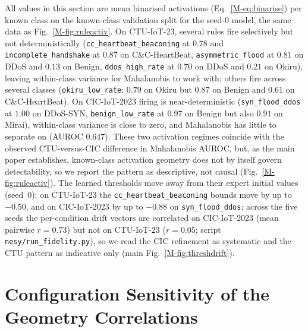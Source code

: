 \documentclass[journal]{IEEEtran}
\begin{document}
All values in this section are mean binarised activations (Eq.~\ref{M-eq:binarise}) per
known class on the known-class validation split for the seed-0 model, the same data as
Fig.~\ref{M-fig:ruleactiv}. On CTU-IoT-23, several rules fire selectively but not deterministically
(\texttt{cc\_heartbeat\_beaconing} at $0.78$ and \texttt{incomplete\_handshake} at
$0.87$ on C\&C-HeartBeat, \texttt{asymmetric\_flood} at $0.81$ on DDoS and $0.13$ on Benign,
\texttt{ddos\_high\_rate} at $0.70$ on DDoS and $0.21$ on Okiru), leaving within-class
variance for Mahalanobis to work with; others fire across several classes
(\texttt{okiru\_low\_rate}: $0.79$ on Okiru but $0.87$ on Benign and $0.61$ on C\&C-HeartBeat). On CIC-IoT-2023 firing is
near-deterministic (\texttt{syn\_flood\_ddos} at $1.00$ on DDoS-SYN,
\texttt{benign\_low\_rate} at $0.97$ on Benign but also $0.91$ on Mirai), within-class variance is close to
zero, and Mahalanobis has little to separate on (AUROC $0.647$). These two activation
regimes coincide with the observed CTU-versus-CIC difference in Mahalanobis AUROC, but,
as the main paper establishes, known-class activation geometry does not by itself govern
detectability, so we report the pattern as descriptive, not causal
(Fig.~\ref{M-fig:ruleactiv}).
The learned thresholds move away from their expert initial values (seed~0): on
CTU-IoT-23 the \texttt{cc\_heartbeat\_beaconing} bounds move by up to $-0.50$, and on
CIC-IoT-2023 by up to $-0.88$ on \texttt{syn\_flood\_ddos}; across the five
seeds the per-condition drift vectors are correlated on CIC-IoT-2023 (mean pairwise $r{=}0.73$) but
not on CTU-IoT-23 ($r{=}0.05$; script \texttt{nesy/run\_fidelity.py}), so we read the CIC refinement as systematic
and the CTU pattern as indicative only (main Fig.~\ref{M-fig:threshdrift}).

\section{Configuration Sensitivity of the Geometry Correlations}
\label{sec:loco}
\end{document}
